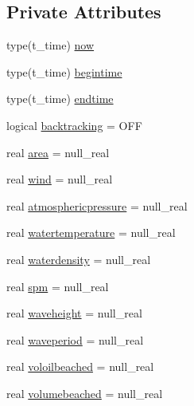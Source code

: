 \subsection*{Private Attributes}
\begin{DoxyCompactItemize}
\item 
type(t\+\_\+time) \mbox{\hyperlink{structmoduleoil__0d_1_1t__external_ac921536aed060570de418aa6cef66139}{now}}
\item 
type(t\+\_\+time) \mbox{\hyperlink{structmoduleoil__0d_1_1t__external_af74c631b18a0bf53fece288bc743e852}{begintime}}
\item 
type(t\+\_\+time) \mbox{\hyperlink{structmoduleoil__0d_1_1t__external_a5cd39bac25958cd67de06faea92ce417}{endtime}}
\item 
logical \mbox{\hyperlink{structmoduleoil__0d_1_1t__external_aed2536166f7b7c5aaf8d758bad6dd73f}{backtracking}} = O\+FF
\item 
real \mbox{\hyperlink{structmoduleoil__0d_1_1t__external_aaebcb0dda315b902cf42d81a8ddb2aa8}{area}} = null\+\_\+real
\item 
real \mbox{\hyperlink{structmoduleoil__0d_1_1t__external_aa6469d47f87a0fb82dfc9cbb8f028b32}{wind}} = null\+\_\+real
\item 
real \mbox{\hyperlink{structmoduleoil__0d_1_1t__external_a671837bbdd3ada5b2ad9a3d9ee431795}{atmosphericpressure}} = null\+\_\+real
\item 
real \mbox{\hyperlink{structmoduleoil__0d_1_1t__external_a23d41eba5d75fd45eedefab4158886fb}{watertemperature}} = null\+\_\+real
\item 
real \mbox{\hyperlink{structmoduleoil__0d_1_1t__external_affaf4fb6b0e5fccd4af93734f297eaf0}{waterdensity}} = null\+\_\+real
\item 
real \mbox{\hyperlink{structmoduleoil__0d_1_1t__external_a18febab81c2633481bb34b6217ac4fa6}{spm}} = null\+\_\+real
\item 
real \mbox{\hyperlink{structmoduleoil__0d_1_1t__external_af0b9afaaa0e8b3f11fbb83a23be82265}{waveheight}} = null\+\_\+real
\item 
real \mbox{\hyperlink{structmoduleoil__0d_1_1t__external_afc7c9d2e22f77aada655c7be387b4b83}{waveperiod}} = null\+\_\+real
\item 
real \mbox{\hyperlink{structmoduleoil__0d_1_1t__external_a1eaa8c91cbd6e6854314040ccdea15a8}{voloilbeached}} = null\+\_\+real
\item 
real \mbox{\hyperlink{structmoduleoil__0d_1_1t__external_addd71d612010741446155aa3e321fce8}{volumebeached}} = null\+\_\+real
\end{DoxyCompactItemize}


